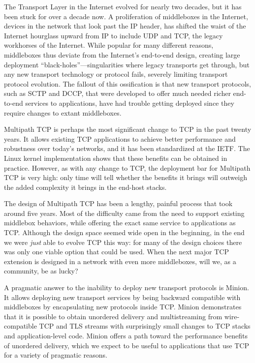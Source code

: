 
The Transport Layer in the Internet evolved for nearly two decades,
but it has been stuck for over a decade now.
A proliferation of middleboxes in the Internet,
devices in the network that look past the IP header,
has shifted the waist of the Internet hourglass 
upward from IP
to include UDP and TCP,
the legacy workhorses of the Internet.
While popular for many
different reasons, 
middleboxes thus deviate from the Internet’s
end-to-end design, creating large deployment
“black-holes”---singularities where legacy transports get through, but
any new transport technology or protocol fails,
severely limiting transport protocol evolution.
The fallout of this ossification
is that new transport protocols,
such as SCTP and DCCP,
that were developed to offer much needed 
richer end-to-end services to applications,
have had trouble getting deployed since they require changes 
to extant middleboxes.

Multipath TCP is perhaps the most significant change to TCP in the past twenty
years. It allows existing TCP applications to achieve better
performance and robustness over today's networks, and it has been
standardized at the IETF. The Linux kernel implementation shows that
these benefits can be obtained in practice.  However, as with any
change to TCP, the deployment bar for Multipath TCP is very high: only
time will tell whether the benefits it brings will outweigh the added
complexity it brings in the end-host stacks.

The design of Multipath TCP has been a lengthy, painful process that took around five
years. Most of the difficulty came from the need to support existing middlebox
behaviors, while offering the exact same service to applications as TCP. Although
the design space seemed wide open in the beginning, in the end we were \emph{just} able
to evolve TCP this way: for many of the design choices there was only one viable option
that could be used. When the next major TCP extension is designed in a network with even more
middleboxes, will we, as a community, be as lucky?

A pragmatic answer to the inability to deploy new transport protocols
is Minion. It allows deploying new transport services 
by being backward compatible with middleboxes by encapsulating new protocols inside TCP.
Minion demonstrates that it is possible to obtain
unordered delivery and multistreaming
from wire-compatible TCP and TLS streams
with surprisingly small changes to TCP stacks
and application-level code.
Minion offers a path toward
the performance benefits of unordered delivery,
which we expect to be useful to applications
that use TCP for a variety of pragmatic reasons.

